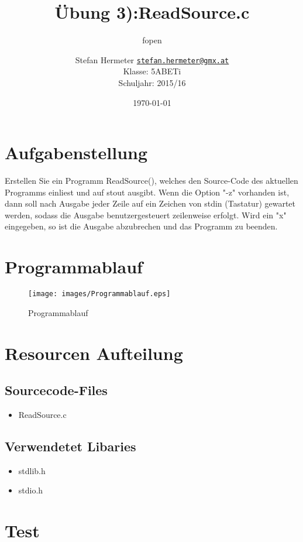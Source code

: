 \documentclass{scrartcl}
\newcommand{\mytitle}{Übung 3)}
\begin{document}
\title{\mytitle:ReadSource.c}
\subtitle{fopen}
\date{\today}
\author{Stefan Hermeter \texttt{\href{mailto:stefan.hermeter@gmx.at}{stefan.hermeter@gmx.at}}\\
  Klasse: 5ABETi\\
  Schuljahr: 2015/16}
\maketitle
{}
\newpage
\tableofcontents
\listoffigures
\newpage
{}
\section{Aufgabenstellung}
Erstellen Sie ein Programm ReadSource(), welches den Source-Code des aktuellen Programms einliest und auf stout ausgibt. Wenn die Option "-z" vorhanden ist, dann soll nach Ausgabe jeder Zeile auf ein Zeichen von stdin (Tastatur) gewartet werden, sodass die Ausgabe benutzergesteuert zeilenweise erfolgt. Wird ein "x" eingegeben, so ist die Ausgabe abzubrechen und das Programm zu beenden.
\section{Programmablauf}
\begin{figure}[H]
  \centering
  \texttt{[image: images/Programmablauf.eps]}
  \caption{Programmablauf}
  \label{fig:digraph}
\end{figure}
\section{Resourcen Aufteilung}
\subsection{Sourcecode-Files}
\begin{itemize}
\item ReadSource.c
\end{itemize}
\subsection{Verwendetet Libaries}
\begin{itemize}
\item stdlib.h
\item stdio.h
\end{itemize}
\section{Test}
\end{document}
